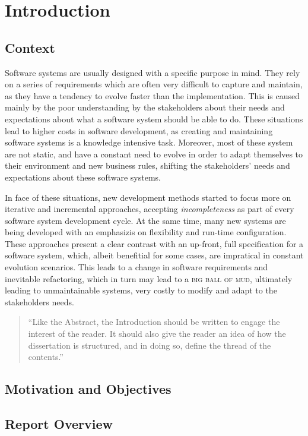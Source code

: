 \chapter{Introduction}\label{chap:intro}

\section{Context}\label{sec:context}

Software systems are usually designed with a specific purpose in mind\cite{}. They rely on a series of requirements which are often very difficult to capture and maintain, as they have a tendency to evolve faster than the implementation. This is caused mainly by the poor understanding by the stakeholders about their needs and expectations about what a software system should be able to do\cite{PT07}. These situations lead to higher costs in software development, as creating and maintaining software systems is a knowledge intensive task\cite{AdOdSBD07}. Moreover, most of these system are not static, and have a constant need to evolve in order to adapt themselves to their environment and new business rules, shifting the stakeholders' needs and expectations about these software systems.

In face of these situations, new development methods started to focus more on iterative and incremental approaches, accepting \textit{incompleteness} as part of every software system development cycle\cite{WC03}. At the same time, many new systems are being developed with an emphasizis on flexibility and run-time configuration\cite{YJ02}. These approaches present a clear contrast with an up-front, full specification for a software system, which, albeit benefitial for some cases, are impratical in constant evolution scenarios. This leads to a change in software requirements and inevitable refactoring, which in turn may lead to a \textsc{big ball of mud}, ultimately leading to unmaintainable systems, very costly to modify and adapt to the stakeholders needs\cite{BIGBALLOFMUD}.

\begin{quote}
  ``Like the Abstract, the Introduction should be written to engage the
  interest of the reader. It should also give the reader an idea of
  how the dissertation is structured, and in doing so, define the
  thread of the contents.''~\citep[chap.\ Introduction]{kn:Tha01}
\end{quote}

\section{Motivation and Objectives}\label{sec:goals}



\section{Report Overview}\label{sec:structure}


